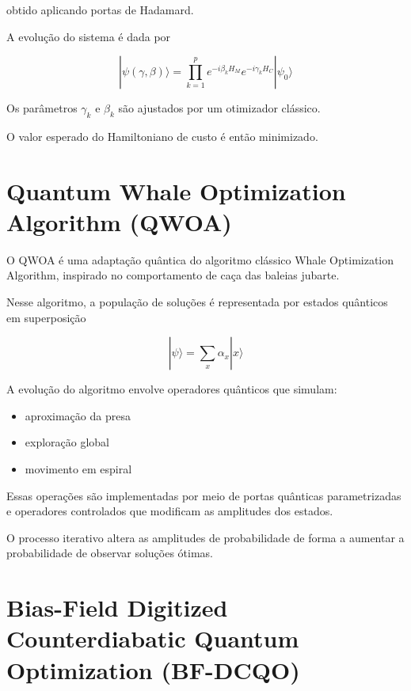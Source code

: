 \documentclass[a4paper,12pt]{article}
\begin{document}
obtido aplicando portas de Hadamard.

A evolução do sistema é dada por

\begin{equation}
|\psi(\gamma,\beta)\rangle =
\prod_{k=1}^{p} e^{-i\beta_k H_M} e^{-i\gamma_k H_C} |\psi_0\rangle
\end{equation}

Os parâmetros $\gamma_k$ e $\beta_k$ são ajustados por um otimizador clássico.

O valor esperado do Hamiltoniano de custo é então minimizado.



\section{Quantum Whale Optimization Algorithm (QWOA)}

\begin{tcolorbox}[colback=red!10,colframe=red!70!black,title=QWOA]
O QWOA é uma adaptação quântica do algoritmo clássico Whale Optimization Algorithm, 
inspirado no comportamento de caça das baleias jubarte. 
\end{tcolorbox}

Nesse algoritmo, a população de soluções é representada por estados quânticos 
em superposição

\begin{equation}
|\psi\rangle = \sum_x \alpha_x |x\rangle
\end{equation}

A evolução do algoritmo envolve operadores quânticos que simulam:

\begin{itemize}
\item aproximação da presa
\item exploração global
\item movimento em espiral
\end{itemize}

Essas operações são implementadas por meio de portas quânticas parametrizadas e 
operadores controlados que modificam as amplitudes dos estados.

O processo iterativo altera as amplitudes de probabilidade de forma a aumentar a 
probabilidade de observar soluções ótimas.

\section{Bias-Field Digitized Counterdiabatic Quantum Optimization (BF-DCQO)}
\end{document}
